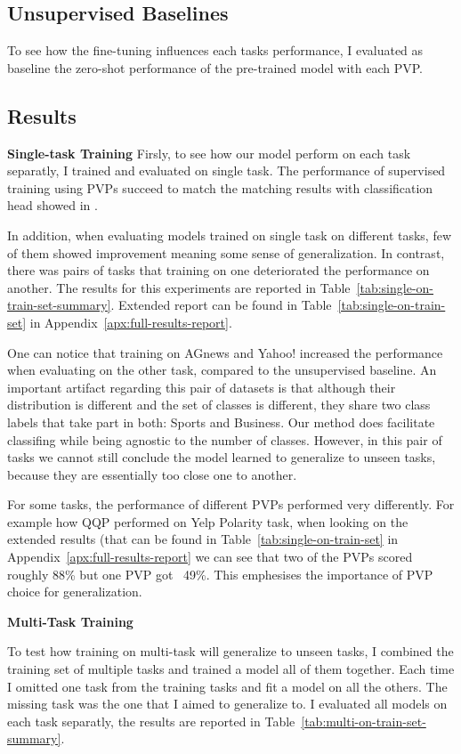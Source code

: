 \documentclass[11pt,a4paper]{article}
\begin{document}
\subsection{Unsupervised Baselines}
To see how the fine-tuning influences each tasks performance, I evaluated as baseline the zero-shot performance of the pre-trained model with each PVP.

\subsection{Results}

\noindent\textbf{Single-task Training}\quad
Firsly, to see how our model perform on each task separatly, I trained and evaluated on single task.
The performance of supervised training using PVPs succeed to match the matching results with classification head showed in \citet{schick2020exploiting}.

In addition, when evaluating models trained on single task on different tasks, few of them showed improvement meaning some sense of generalization.
In contrast, there was pairs of tasks that training on one deteriorated the performance on another.
The results for this experiments are reported in Table~\ref{tab:single-on-train-set-summary}.
Extended report can be found in Table~\ref{tab:single-on-train-set} in Appendix~\ref{apx:full-results-report}.

One can notice that training on AGnews and Yahoo! increased the performance when evaluating on the other task, compared to the unsupervised baseline.
An important artifact regarding this pair of datasets is that although their distribution is different and the set of classes is different, they share two class labels that take part in both: Sports and Business.
Our method does facilitate classifing while being agnostic to the number of classes.
However, in this pair of tasks we cannot still conclude the model learned to generalize to unseen tasks, because they are essentially too close one to another.

For some tasks, the performance of different PVPs performed very differently.
For example how QQP performed on Yelp Polarity task, when looking on the extended results (that can be found in Table~\ref{tab:single-on-train-set} in Appendix~\ref{apx:full-results-report} we can see that two of the PVPs scored roughly 88\% but one PVP got ~49\%.
This emphesises the importance of PVP choice for generalization.

\vspace{8pt}
\noindent\textbf{Multi-Task Training}\quad

To test how training on multi-task will generalize to unseen tasks, I combined the training set of multiple tasks and trained a model all of them together.
Each time I omitted one task from the training tasks and fit a model on all the others.
The missing task was the one that I aimed to generalize to.
I evaluated all models on each task separatly, the results are reported in Table~\ref{tab:multi-on-train-set-summary}.
\end{document}
